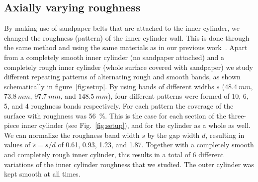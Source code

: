 \documentclass[aps,twocolumn,10pt,floatfix, superscriptaddress,longbibliography,pra]{revtex4-1}
\begin{document}
\subsection{Axially varying roughness}
By making use of sandpaper belts that are attached to the inner cylinder, we changed the roughness (pattern) of the inner cylinder wall. This is done through the same method and using the same materials as in our previous work~\citep{Bakhuis2019}. Apart from a completely smooth inner cylinder (no sandpaper attached) and a completely rough inner cylinder (whole surface covered with sandpaper) we study different repeating patterns of alternating rough and smooth bands, as shown schematically in figure~\ref{fig:setup}. By using bands of different widths $s$ ($\SI{48.4}{mm}$, $\SI{73,8}{mm}$, $\SI{97.7}{mm}$, and $\SI{148.5}{mm}$), four different patterns were formed of 10, 6, 5, and 4 roughness bands respectively. For each pattern the coverage of the surface with roughness was \SI{56}{\percent}. This is the case for each section of the three-piece inner cylinder (see Fig.~\ref{fig:setup}), and for the cylinder as a whole as well. We can normalize the roughness band width $s$ by the gap width $d$, resulting in values of $\tilde{s} = s/d$ of 0.61, 0.93, 1.23, and 1.87. Together with a completely smooth and completely rough inner cylinder, this results in a total of 6 different variations of the inner cylinder roughness that we studied. The outer cylinder was kept smooth at all times.
\end{document}
